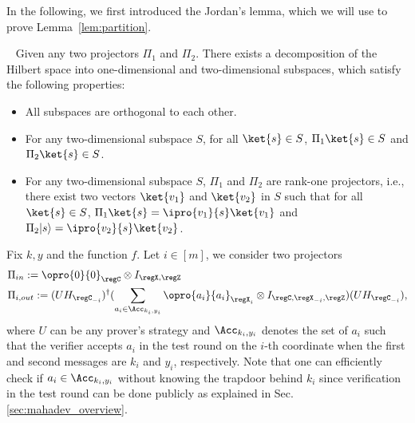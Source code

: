 In the following, we first introduced the Jordan's lemma, which we will use to prove Lemma~\ref{lem:partition}. 
\begin{lemma}~\label{lemma:Jordan}
Given any two projectors $\Pi_1$ and $\Pi_2$. There exists a decomposition of the Hilbert space into one-dimensional and two-dimensional subspaces, which satisfy the following properties: 
\begin{itemize}
    \item All subspaces are orthogonal to each other.
    \item For any two-dimensional subspace $S$, for all $\ket{s}\in S$, $\Pi_1 \ket{s} \in S$ and $\Pi_2 \ket{s} \in S$.
    \item For any two-dimensional subspace $S$, $\Pi_1$ and $\Pi_2$ are rank-one projectors, i.e., there exist two vectors $\ket{v_1}$ and $\ket{v_2}$ in $S$ such that for all $ \ket{s}\in S$,  $\Pi_1 \ket{s} = \ipro{v_1}{s}\ket{v_1}$ and $\Pi_2 |s\rangle =\ipro{v_2}{s}\ket{v_2}$. 
\end{itemize}
\end{lemma}


Fix $k,y$ and the function $f$. Let $i\in [m]$, we consider two projectors 
\begin{align*}
    &\Pi_{in}:= \opro{0}{0}_{\regC}\otimes I_{\regX,\regZ}\\
   & \Pi_{i,out} := (UH_{\regC_{-i}})^{\dag}(\sum_{a_i\in \Acc_{k_i,y_i}}\opro{a_i}{a_i}_{\regX_i}\otimes I_{\regC,\regX_{-i},\regZ}) (UH_{\regC_{-i}}),
\end{align*}
where $U$ can be any prover's strategy and $\Acc_{k_i,y_i}$ denotes the set of $a_i$ such that the verifier accepts $a_i$ in the test round on the $i$-th coordinate when the first and second messages are $k_i$ and $y_i$, respectively. 
Note that one can efficiently check if $a_i\in \Acc_{k_i,y_i}$ without knowing the trapdoor behind $k_i$ since verification in the test round can be done publicly as explained in Sec. \ref{sec:mahadev_overview}.

